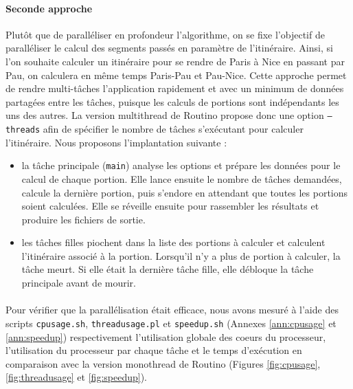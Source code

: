 \paragraph{Seconde approche}
Plutôt que de paralléliser en profondeur l'algorithme, on se fixe l'objectif de
paralléliser le calcul des segments passés en paramètre de l'itinéraire. Ainsi,
si l'on souhaite calculer un itinéraire pour se rendre de Paris à Nice en
passant par Pau, on calculera en même temps Paris-Pau et Pau-Nice. Cette
approche permet de rendre multi-tâches l'application rapidement et avec un
minimum de données partagées entre les tâches, puisque les calculs de portions
sont indépendants les uns des autres. La version multithread de Routino propose
donc une option \texttt{--threads} afin de spécifier le nombre de tâches 
s'exécutant pour calculer l'itinéraire. Nous proposons l'implantation suivante :
\begin{itemize}
\renewcommand{\labelitemi}{$\bullet$}
\item la tâche principale (\texttt{main}) analyse les options et prépare les
  données pour le calcul de chaque portion. Elle lance ensuite le nombre de
  tâches demandées, calcule la dernière portion, puis s'endore en attendant que
  toutes les portions soient calculées. Elle se réveille ensuite pour rassembler
  les résultats et produire les fichiers de sortie.
\item les tâches filles piochent dans la liste des portions à calculer et
  calculent l'itinéraire associé à la portion. Lorsqu'il n'y a plus de portion
  à calculer, la tâche meurt. Si elle était la dernière tâche fille, elle
  débloque la tâche principale avant de mourir.
\end{itemize}
\paragraph{}
Pour vérifier que la parallélisation était efficace, nous avons mesuré à l'aide
des scripts \texttt{cpusage.sh}, \texttt{threadusage.pl} et \texttt{speedup.sh}
(Annexes \ref{ann:cpusage} et \ref{ann:speedup})
respectivement l'utilisation globale des coeurs du processeur, l'utilisation du
processeur par chaque tâche et le temps d'exécution en comparaison avec la 
version monothread de Routino (Figures \ref{fig:cpusage}, \ref{fig:threadusage}
et \ref{fig:speedup}).

